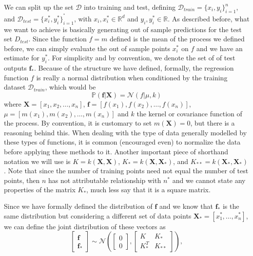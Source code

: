 We can split up the set $\mathcal{D}$ into training and test, defining $\mathcal{D}_{train} = \{ x_i , y_i \}_{i=1}^n$, and $\mathcal{D}_{test} = \{ x^*_i , y^*_i \}_{i=1}^{^*}$, with $x_i, x^*_i \in \mathbb{R}^d$ and $y_i, y^*_i \in \mathbb{R}$. As described before, what we want to achieve is basically generating out of sample predictions for the test set $D_{test}$. Since the function $f = m$ defined is the mean of the process we defined before, we can simply evaluate the out of sample points $x_i^*$ on $f$ and we have an estimate for $y_i^*$. For simplicity and by convention, we denote the set of of test outputs $\boldsymbol{f}_*$. Because of the structure we have defined, formally, the regression function $f$ is really a normal distribution when conditioned by the training dataset $\mathcal{D}_{train}$, which would be
\[ \mathbb{P}(\boldsymbol{f} | \boldsymbol{X}) = \mathcal{N}(f | \mu, k) \]
where $\boldsymbol{X} = [ x_1, x_2, \ldots , x_n ]$, $\boldsymbol{f} = [ f(x_1), f(x_2), \ldots, f(x_n) ]$, $\mu= [ m(x_1), m(x_2), \ldots, m(x_n) ]$ and $k$ the kernel or covariance function of the process. By convention, it is customary to set $m(\boldsymbol{X}) = 0$, but there is a reasoning behind this. When dealing with the type of data generally modelled by these types of functions, it is common (encouraged even) to normalize the data before applying these methods to it. Another important piece of shorthand notation we will use is $K=k(\boldsymbol{X}, \boldsymbol{X})$, $K_*=k(\boldsymbol{X}, \boldsymbol{X}_*)$, and $K_{**}=k(\boldsymbol{X}_*, \boldsymbol{X}_*)$. Note that since the number of training points need not equal the number of test points, then $n$ has not attributable relationship with $n^*$ and we cannot state any properties of the matrix $K_*$, much less say that it is a square matrix. 

Since we have formally defined the distribution of $\boldsymbol{f}$ and we know that $\boldsymbol{f}_*$ is the same distribution but considering a different set of data points $\boldsymbol{X}_* = [x^*_1, \ldots, x^*_n]$, we can define the joint distribution of these vectors as 
\begin{equation}
	\label{joint_dist}
	\begin{bmatrix}
		\boldsymbol{f} \\
		\boldsymbol{f}_*
	\end{bmatrix} \sim \mathcal{N}\left( \begin{bmatrix}
		0 \\
		0
	\end{bmatrix} , \begin{bmatrix}
		K & K_* \\
		K_*^T & K_{**}
	\end{bmatrix} \right), 
\end{equation}

